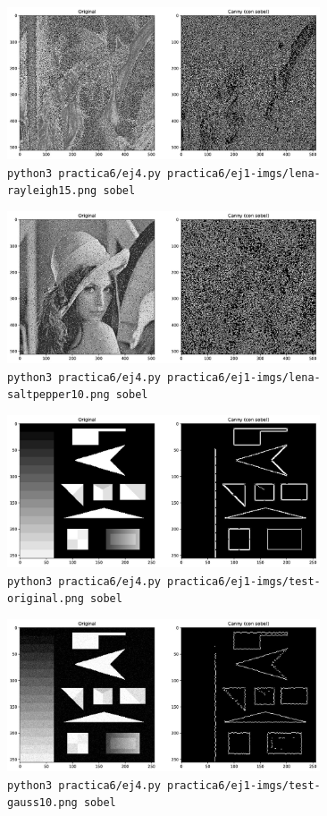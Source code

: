 \documentclass[11pt, spanish]{article}
\begin{document}
\begin{figure}[H]
\centering
    \includegraphics[height=4.5cm]{informe-imgs/ej4-sobel-lena-rayleigh15.jpg}
    \caption{\texttt{python3 practica6/ej4.py practica6/ej1-imgs/lena-rayleigh15.png sobel}}
\end{figure}

\begin{figure}[H]
\centering
    \includegraphics[height=4.5cm]{informe-imgs/ej4-sobel-lena-saltpepper10.jpg}
    \caption{\texttt{python3 practica6/ej4.py practica6/ej1-imgs/lena-saltpepper10.png sobel}}
\end{figure}


\begin{figure}[H]
\centering
    \includegraphics[height=4.5cm]{informe-imgs/ej4-sobel-test-original.jpg}
    \caption{\texttt{python3 practica6/ej4.py practica6/ej1-imgs/test-original.png sobel}}
\end{figure}

\begin{figure}[H]
\centering
    \includegraphics[height=4.5cm]{informe-imgs/ej4-sobel-test-gauss10.jpg}
    \caption{\texttt{python3 practica6/ej4.py practica6/ej1-imgs/test-gauss10.png sobel}}
\end{figure}
\end{document}
